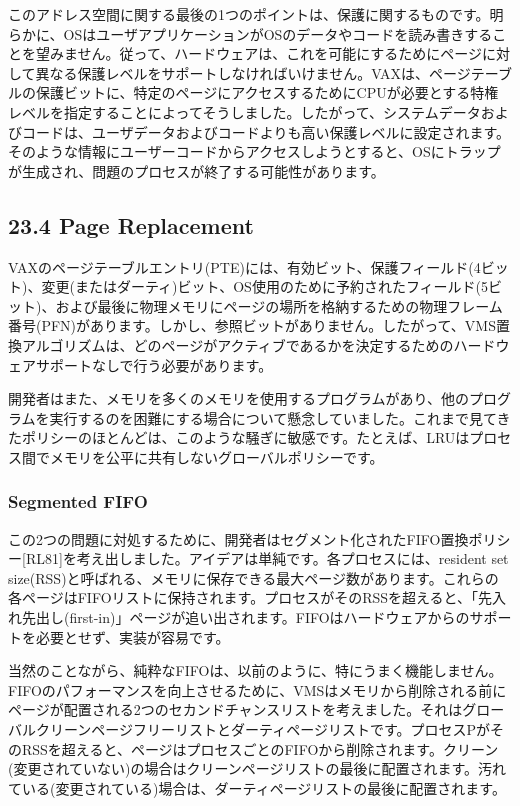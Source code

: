 このアドレス空間に関する最後の1つのポイントは、保護に関するものです。明らかに、OSはユーザアプリケーションがOSのデータやコードを読み書きすることを望みません。従って、ハードウェアは、これを可能にするためにページに対して異なる保護レベルをサポートしなければいけません。VAXは、ページテーブルの保護ビットに、特定のページにアクセスするためにCPUが必要とする特権レベルを指定することによってそうしました。したがって、システムデータおよびコードは、ユーザデータおよびコードよりも高い保護レベルに設定されます。そのような情報にユーザーコードからアクセスしようとすると、OSにトラップが生成され、問題のプロセスが終了する可能性があります。

\hypertarget{page-replacement}{%
\subsection*{23.4 Page Replacement}\label{page-replacement}}

VAXのページテーブルエントリ(PTE)には、有効ビット、保護フィールド(4ビット)、変更(またはダーティ)ビット、OS使用のために予約されたフィールド(5ビット)、および最後に物理メモリにページの場所を格納するための物理フレーム番号(PFN)があります。しかし、参照ビットがありません。したがって、VMS置換アルゴリズムは、どのページがアクティブであるかを決定するためのハードウェアサポートなしで行う必要があります。

開発者はまた、メモリを多くのメモリを使用するプログラムがあり、他のプログラムを実行するのを困難にする場合について懸念していました。これまで見てきたポリシーのほとんどは、このような騒ぎに敏感です。たとえば、LRUはプロセス間でメモリを公平に共有しないグローバルポリシーです。

\hypertarget{segmented-fifo}{%
\subsubsection*{Segmented FIFO}\label{segmented-fifo}}

この2つの問題に対処するために、開発者はセグメント化されたFIFO置換ポリシー{[}RL81{]}を考え出しました。アイデアは単純です。各プロセスには、resident
set
size(RSS)と呼ばれる、メモリに保存できる最大ページ数があります。これらの各ページはFIFOリストに保持されます。プロセスがそのRSSを超えると、「先入れ先出し(first-in)」ページが追い出されます。FIFOはハードウェアからのサポートを必要とせず、実装が容易です。

当然のことながら、純粋なFIFOは、以前のように、特にうまく機能しません。FIFOのパフォーマンスを向上させるために、VMSはメモリから削除される前にページが配置される2つのセカンドチャンスリストを考えました。それはグローバルクリーンページフリーリストとダーティページリストです。プロセスPがそのRSSを超えると、ページはプロセスごとのFIFOから削除されます。クリーン(変更されていない)の場合はクリーンページリストの最後に配置されます。汚れている(変更されている)場合は、ダーティページリストの最後に配置されます。

